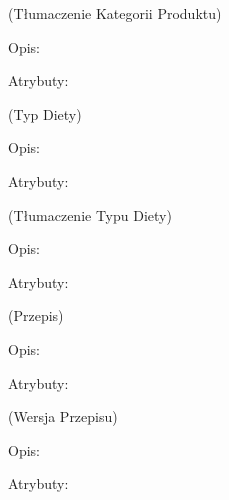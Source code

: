 \begin{enumerate}[label={\textbf{KAT/\protect\threedigits{\theenumi}}}, wide, labelwidth=!, labelindent=0pt, labelsep=0pt, series=reqs]
     \label{kat:ProductCategoryTranslation} (Tłumaczenie Kategorii Produktu)

    Opis: \lipsum[1]
    \par
    Atrybuty:
    \begin{itemize}[series=atr]
         \label{kat:ProductCategoryTranslation:id}
         \label{kat:ProductCategoryTranslation:translation}
         \label{kat:ProductCategoryTranslation:language}
    \end{itemize}

     \label{kat:DietType} (Typ Diety)

    Opis: \lipsum[1]
    \par
    Atrybuty:
    \begin{itemize}[series=atr]
         \label{kat:DietType:id}
         \label{kat:DietType:name}
    \end{itemize}

     \label{kat:DietTypeTranslation} (Tłumaczenie Typu Diety)

    Opis: \lipsum[1]
    \par
    Atrybuty:
    \begin{itemize}[series=atr]
         \label{kat:DietTypeTranslation:id}
         \label{kat:DietTypeTranslation:translation}
         \label{kat:DietTypeTranslation:language}
    \end{itemize}

     \label{kat:Recipe} (Przepis)

    Opis: \lipsum[1]
    \par
    Atrybuty:
    \begin{itemize}[series=atr]
         \label{kat:Recipe:id}
         \label{kat:Recipe:isPublic}
         \label{kat:Recipe:language}
    \end{itemize}

     \label{kat:RecipeVersion} (Wersja Przepisu)

    Opis: \lipsum[1]
    \par
    Atrybuty:
    \begin{itemize}[series=atr]
         \label{kat:RecipeVersion:id}
         \label{kat:RecipeVersion:editTimestamp}
         \label{kat:RecipeVersion:name}
         \label{kat:RecipeVersion:preparationTimeMinutes}
         \label{kat:RecipeVersion:numberOfPortions}
         \label{kat:RecipeVersion:image}
         \label{kat:RecipeVersion:totalGramsWeight}
    \end{itemize}


\end{enumerate}
